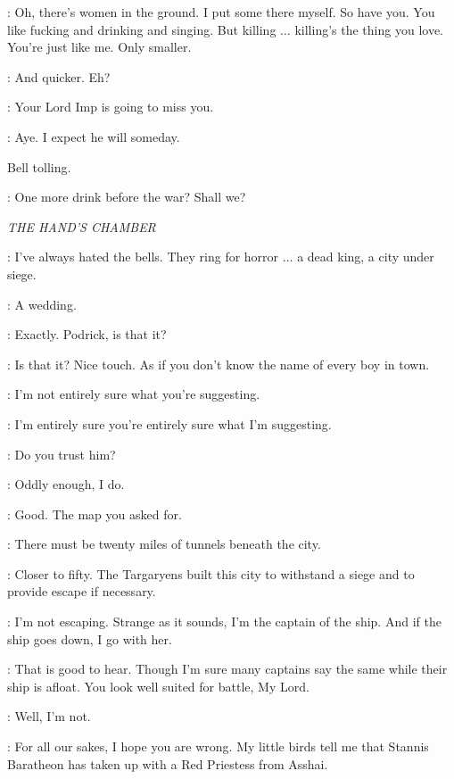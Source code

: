 \HOUND: Oh, there's women in the ground. I put some there myself. So have you. You like fucking and drinking and singing. But killing $\ldots$ killing's the thing you love. You're just like me. Only smaller. 

\BRONN: And quicker. Eh? 

\HOUND: Your Lord Imp is going to miss you. 


\BRONN: Aye. I expect he will someday. 

\sfx Bell tolling.

\BRONN: One more drink before the war? Shall we? 


\scene

\textit{THE HAND'S CHAMBER}


\VARYS: I've always hated the bells. They ring for horror $\ldots$ a dead king, a city under siege. 

\TYRION: A wedding. 

\VARYS: Exactly. Podrick, is that it? 

\TYRION: Is that it? Nice touch. As if you don't know the name of every boy in town. 

\VARYS: I'm not entirely sure what you're suggesting. 

\TYRION: I'm entirely sure you're entirely sure what I'm suggesting. 

\VARYS: Do you trust him? 

\TYRION: Oddly enough, I do. 

\VARYS: Good. The map you asked for. 

\TYRION: There must be twenty miles of tunnels beneath the city. 

\VARYS: Closer to fifty. The Targaryens built this city to withstand a siege and to provide escape if necessary. 

\TYRION: I'm not escaping. Strange as it sounds, I'm the captain of the ship. And if the ship goes down, I go with her. 

\VARYS: That is good to hear. Though I'm sure many captains say the same while their ship is afloat. You look well suited for battle, My Lord. 

\TYRION: Well, I'm not. 

\VARYS: For all our sakes, I hope you are wrong. My little birds tell me that Stannis Baratheon has taken up with a Red Priestess from Asshai. 

